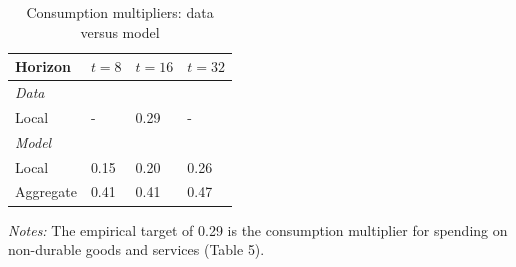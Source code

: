 \documentclass[\latexroot/\projectname]{subfiles}
\begin{document}
\begin{table}[h]
  \centering
  \caption{Consumption multipliers: data versus model\whenintegrated{\label{tab:qa-consumption-multipliers}}}
  \begin{tabular}{llll}
    \hline
    \textbf{Horizon} & $t=8$ & $t=16$ & $t=32$ \\
    \hline
    \textit{Data} &&& \\
    \hspace{1em} Local & - & 0.29 & - \\
    \textit{Model} &&& \\
    \hspace{1em} Local & 0.15 & 0.20 & 0.26 \\
    \hspace{1em} Aggregate & 0.41 & 0.41 & 0.47 \\
    \hline
  \end{tabular}
  \begin{flushleft}
    \footnotesize
    \textit{Notes:} The empirical target of 0.29 is the consumption multiplier for spending on non-durable goods and services (Table 5).
  \end{flushleft}
\end{table}

\smartbib
\end{document}
